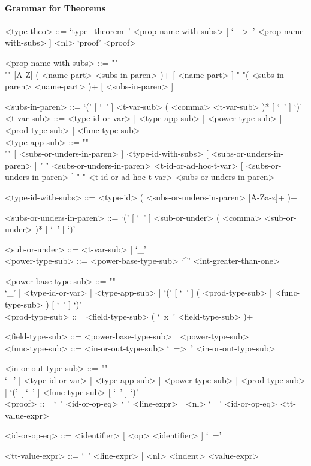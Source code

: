 \documentclass{article}
\begin{document}
\newpage

\paragraph{Grammar for Theorems}

\begin{grammar}
<type-theo> ::= 
`type_theorem\ ' <prop-name-with-subs> [ `\ -->\ ' <prop-name-with-subs> ] <nl> 
`proof' <proof>

<prop-name-with-subs> ::=  ""\\""
[A-Z] ( <name-part> <subs-in-paren> )+ [ <name-part> ]
\alt " "( <subs-in-paren> <name-part> )+ [ <subs-in-paren> ]

<subs-in-paren> ::=
`(' [ `\ ' ] <t-var-sub> ( <comma> <t-var-sub> )* [ `\ ' ] `)'
\\

<t-var-sub> ::=
<type-id-or-var> | <type-app-sub> | <power-type-sub> | <prod-type-sub> |
<func-type-sub> 
\\

<type-app-sub> ::= ""\\""
[ <subs-or-unders-in-paren> ] <type-id-with-subs> [ <subs-or-unders-in-paren> ]
\alt " "
<subs-or-unders-in-paren> <t-id-or-ad-hoc-t-var> [ <subs-or-unders-in-paren> ]
\alt " "
<t-id-or-ad-hoc-t-var> <subs-or-unders-in-paren>

<type-id-with-subs> ::= <type-id> ( <subs-or-unders-in-paren> [A-Za-z]+ )+

<subs-or-unders-in-paren> ::=
`(' [ `\ ' ] <sub-or-under> ( <comma> <sub-or-under> )* [ `\ ' ] `)'

<sub-or-under> ::= <t-var-sub> | `_'
\\

<power-type-sub> ::= <power-base-type-sub> `^' <int-greater-than-one>

<power-base-type-sub> ::= ""\\
`_' | <type-id-or-var> | <type-app-sub> |
`(' [ `\ ' ] ( <prod-type-sub> | <func-type-sub> ) [ `\ ' ] `)'
\\

<prod-type-sub> ::= <field-type-sub> ( `\ x\ ' <field-type-sub> )+

<field-type-sub> ::= <power-base-type-sub> | <power-type-sub>
\\

<func-type-sub> ::= <in-or-out-type-sub> `\ =>\ ' <in-or-out-type-sub>

<in-or-out-type-sub> ::= ""\\
`_' | <type-id-or-var> | <type-app-sub> | <power-type-sub> | <prod-type-sub> |
`(' [ `\ ' ] <func-type-sub> [ `\ ' ] `)'
\\

<proof> ::= 
`\ ' <id-or-op-eq> `\ ' <line-expr> |
<nl> `\ \ ' <id-or-op-eq>  <tt-value-expr>

<id-or-op-eq> ::= <identifier> [ <op> <identifier> ] `\ ='

<tt-value-expr> ::= `\ ' <line-expr> | <nl> <indent> <value-expr>
\end{grammar} 
\end{document}

